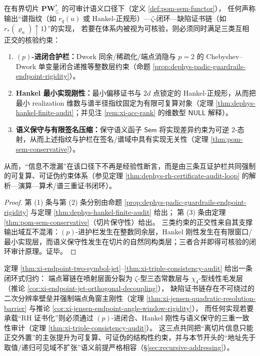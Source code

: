 \begin{theorem}\label{thm:xi-triple-consistency-audit}
在有界切片 \(\mathbf{PW}^{\ast}_{\le}\) 的可审计语义口径下（定义 \ref{def:pom-sem-functor}），
任何声称输出“谱指纹（如 \(r_q(u)\) 或 Hankel-正规形）—\(\zeta\)-闭环—缺陷证书链（如 \(r_\ast(\varrho_n)\uparrow 1\)）”的实现，
若要在体系内被视为可核验，则必须同时满足三类互相正交的核验约束：
\begin{enumerate}
  \item \textbf{\((p)\)-进闭合护栏：}Dwork 同余/稀疏化/端点消隐与 \(p=2\) 的 Chebyshev--Dwork 单变量闭合递推等整数层约束（命题 \ref{prop:dephys-padic-guardrails-endpoint-rigidity}）。
  \item \textbf{Hankel 最小实现刚性：}最小偏移证书与 \(2d\) 点锁定的 Hankel-正规形，从而把最小 realization 维数与谱半径指纹固定为有限可复算对象（定理 \ref{thm:dephys-hankel-finite-audit}；并见注 \ref{rem:xi-acc-rank} 的维数型 \(\mathsf{NULL}\) 解释）。
  \item \textbf{语义保守与有限签名压缩：}保守语义函子 \(\mathsf{Sem}\) 将实现差异约束为可逆 \(2\)-态射，从而上述指纹与护栏在签名/谱域中具有实现无关性（定理 \ref{thm:pom-sem-conservative}）。
\end{enumerate}
从而，“信息不泄漏”在该口径下不再是经验性断言，而是由三条互证护栏共同强制的可复算、可证伪约束体系（参见定理 \ref{thm:dephys-rh-certificate-audit-loop} 的解析—演算—算术/谱三重证书闭环）。
\end{theorem}

\begin{proof}
第 (1) 条与第 (2) 条分别由命题 \ref{prop:dephys-padic-guardrails-endpoint-rigidity} 与定理 \ref{thm:dephys-hankel-finite-audit} 给出；
第 (3) 条由定理 \ref{thm:pom-sem-conservative}（切片保守性）给出。
三类约束的正交性来自其支撑输出域互不混淆：\((p)\)-进护栏发生在整数同余层，Hankel 刚性发生在有限窗口/最小实现层，而语义保守性发生在切片的自然同构类层；三者合并即得可核验的闭环审计原理。证毕。
\end{proof}

\begin{remark}\label{rem:xi-auditable-reduction-closed-loop}
定理 \ref{thm:xi-endpoint-two-symbol-jet}--\ref{thm:xi-triple-consistency-audit} 给出一条闭环式归约：
端点幂链在喷射层面分裂为 \(\zeta\)-型三态常数层与 \(\chi_4\)-型线性毛发层（推论 \ref{cor:xi-endpoint-jet-orthogonal-decoupling}），
缺陷证书链存在不可绕过的二次分辨率壁垒并强制端点角窗主刚性（定理 \ref{thm:xi-jensen-quadratic-resolution-barrier} 与推论 \ref{cor:xi-jensen-endpoint-angle-window-rigidity}），
而任何实现若要承载“RH 证书化”则必须通过 \((p)\)-进闭合、Hankel 刚性与语义保守的三重一致性审计（定理 \ref{thm:xi-triple-consistency-audit}）。
这三点共同把“离切片信息只能正交外置”的主张提升为可复算、可证伪的结构性约束，并与本节开头的“地址先于取值/递归可见域不扩张”语义前提严格相容（\S\ref{sec:recursive-addressing}）。
\end{remark}

